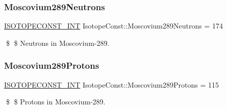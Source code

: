 \subsubsection{\texorpdfstring{Moscovium289\+Neutrons}{Moscovium289Neutrons}}
{\footnotesize\ttfamily \mbox{\hyperlink{group___isotope_const-_macros_ga5f18360b3e99483a35c32d789e62621c}{I\+S\+O\+T\+O\+P\+E\+C\+O\+N\+S\+T\+\_\+\+I\+NT}} Isotope\+Const\+::\+Moscovium289\+Neutrons = 174}

\$ \$ Neutrons in Moscovium-\/289. \mbox{\label{group___isotope_const-_moscovium-_mc289_gae37d75ea6781d6a774b2f0d74f0eadad}} 
\subsubsection{\texorpdfstring{Moscovium289\+Protons}{Moscovium289Protons}}
{\footnotesize\ttfamily \mbox{\hyperlink{group___isotope_const-_macros_ga5f18360b3e99483a35c32d789e62621c}{I\+S\+O\+T\+O\+P\+E\+C\+O\+N\+S\+T\+\_\+\+I\+NT}} Isotope\+Const\+::\+Moscovium289\+Protons = 115}

\$ \$ Protons in Moscovium-\/289. 